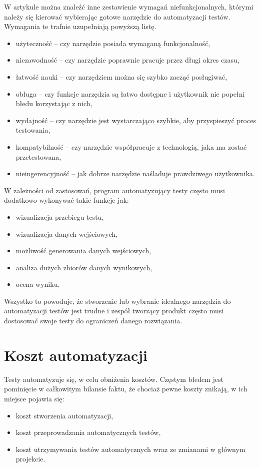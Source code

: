 \documentclass[00-praca-magisterska.tex]{subfiles}
\begin{document}
W artykule \cite{snake-oil} można znaleźć inne zestawienie wymagań
niefunkcjonalnych, którymi należy się kierować wybierając gotowe narzędzie do
automatyzacji testów. Wymagania te trafnie uzupełniają powyższą listę.
\begin{itemize}
\item użyteczność -- czy narzędzie posiada wymaganą funkcjonalność,
\item niezawodność -- czy narzędzie poprawnie pracuje przez długi okres czasu,
\item łatwość nauki -- czy narzędziem można się szybko zacząć posługiwać,
\item obługa -- czy funkcje narzędzia są łatwo dostępne i użytkownik nie popełni błedu korzystając z nich,
\item wydajność -- czy narzędzie jest wystarczająco szybkie, aby przyspieszyć proces testowania,
\item kompatybilność -- czy narzędzie współpracuje z technologią, jaka ma zostać przetestowana,
\item nieingerencyjność -- jak dobrze narzędzie naśladuje prawdziwego użytkownika.
\end{itemize}

W zależności od zastosowań, program automatyzujący testy często musi dodatkowo
wykonywać takie funkcje jak:
\begin{itemize}
\item wizualizacja przebiegu testu,
\item wizualizacja danych wejściowych,
\item możliwość generowania danych wejściowych,
\item analiza dużych zbiorów danych wynikowych,
\item ocena wyniku.
\end{itemize}

Wszystko to powoduje, że stworzenie lub wybranie idealnego narzędzia do
automatyzacji testów jest trudne i zespół tworzący produkt często musi
dostosować swoje testy do ograniczeń danego rozwiązania.

\section{Koszt automatyzacji}

Testy automatyzuje się, w celu obniżenia kosztów. Częstym błedem jest
pominięcie w całkowitym bilansie faktu, że chociaż pewne koszty znikają, w ich
miejsce pojawia się:
\begin{itemize}
\item koszt stworzenia automatyzacji,
\item koszt przeprowadzania automatycznych testów,
\item koszt utrzymywania testów automatycznych wraz ze zmianami w głównym
projekcie.
\end{itemize}
\end{document}
